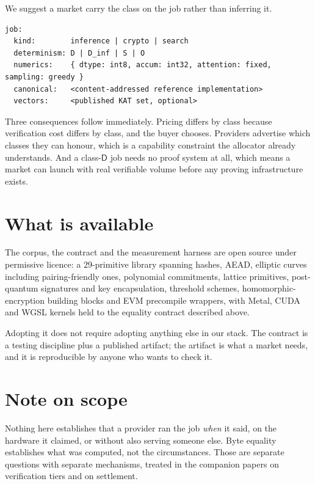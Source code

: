 \documentclass[11pt,a4paper]{article}
\begin{document}
We suggest a market carry the class on the job rather than inferring it.

\begin{lstlisting}
job:
  kind:        inference | crypto | search
  determinism: D | D_inf | S | O
  numerics:    { dtype: int8, accum: int32, attention: fixed, sampling: greedy }
  canonical:   <content-addressed reference implementation>
  vectors:     <published KAT set, optional>
\end{lstlisting}

Three consequences follow immediately. Pricing differs by class because
verification cost differs by class, and the buyer chooses. Providers advertise
which classes they can honour, which is a capability constraint the allocator
already understands. And a class-$\mathsf{D}$ job needs no proof system at all,
which means a market can launch with real verifiable volume before any proving
infrastructure exists.

\section{What is available}

The corpus, the contract and the measurement harness are open source under
permissive licence: a 29-primitive library spanning hashes, AEAD, elliptic
curves including pairing-friendly ones, polynomial commitments, lattice
primitives, post-quantum signatures and key encapsulation, threshold schemes,
homomorphic-encryption building blocks and EVM precompile wrappers, with Metal,
CUDA and WGSL kernels held to the equality contract described above.

Adopting it does not require adopting anything else in our stack. The contract
is a testing discipline plus a published artifact; the artifact is what a market
needs, and it is reproducible by anyone who wants to check it.

\section*{Note on scope}

Nothing here establishes that a provider ran the job \emph{when} it said, on the
hardware it claimed, or without also serving someone else. Byte equality
establishes what was computed, not the circumstances. Those are separate
questions with separate mechanisms, treated in the companion papers on
verification tiers and on settlement.
\end{document}
